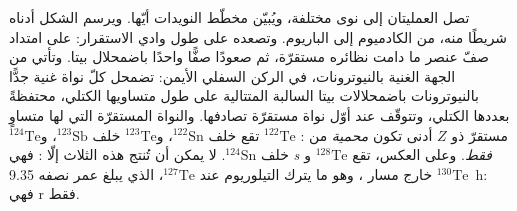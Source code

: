 تصل العمليتان إلى نوى مختلفة، ويُبيّن مخطّط النويدات أيّها.
ويرسم الشكل أدناه شريطًا منه، من الكادميوم إلى الباريوم. وتصعده 
على طول وادي الاستقرار: على امتداد صفّ عنصر ما دامت نظائره مستقرّة،
ثم صعودًا صفًّا واحدًا باضمحلال بيتا.
وتأتي  من الجهة الغنية بالنيوترونات، في الركن السفلي الأيمن:
تضمحل كلّ نواة غنية جدًّا بالنيوترونات باضمحلالات بيتا السالبة المتتالية
على طول متساويها الكتلي، محتفظةً بعددها الكتلي، وتتوقّف عند أوّل
نواة مستقرّة تصادفها. والنواة المستقرّة التي لها متساوٍ مستقرّ
ذو $Z$ أدنى تكون \emph{محمية} من : $^{122}\mathrm{Te}$
تقع خلف $^{122}\mathrm{Sn}$، و$^{123}\mathrm{Te}$ خلف
$^{123}\mathrm{Sb}$، و$^{124}\mathrm{Te}$ خلف $^{124}\mathrm{Sn}$.
لا يمكن أن تُنتج هذه الثلاث إلّا : فهي
\emph{s فقط}. وعلى العكس، تقع $^{128}\mathrm{Te}$ و$^{130}\mathrm{Te}$
خارج مسار ، وهو ما يترك التيلوريوم عند $^{127}\mathrm{Te}$،
الذي يبلغ عمر نصفه \qty{9.35}{h}: فهي r فقط.

